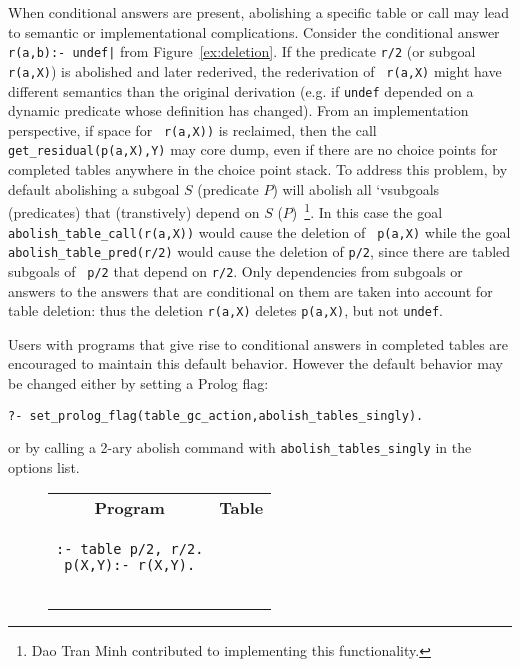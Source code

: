 \begin{description}
When conditional answers are present, abolishing a specific table or
call may lead to semantic or implementational complications.  Consider
the conditional answer {\tt r(a,b):- undef|} from
Figure~\ref{ex:deletion}.  If the predicate {\tt r/2} (or subgoal {\tt
  r(a,X)}) is abolished and later rederived, the rederivation of {\tt
  r(a,X)} might have different semantics than the original derivation
(e.g. if {\tt undef} depended on a dynamic predicate whose definition
has changed).  From an implementation perspective, if space for {\tt
  r(a,X))} is reclaimed, then the call {\tt get\_residual(p(a,X),Y)}
may core dump, even if there are no choice points for completed tables
anywhere in the choice point stack.  To address this problem, by
default abolishing a subgoal $S$ (predicate $P$) will abolish all
`vsubgoals (predicates) that (transtively) depend on $S$
($P$)~\footnote{Dao Tran Minh contributed to implementing this
  functionality.}.  In this case the goal {\tt
  abolish\_table\_call(r(a,X))} would cause the deletion of {\tt
  p(a,X)} while the goal {\tt abolish\_table\_pred(r/2)} would cause
the deletion of {\tt p/2}, since there are tabled subgoals of {\tt
  p/2} that depend on {\tt r/2}.  Only dependencies from subgoals or
answers to the answers that are conditional on them are taken into
account for table deletion: thus the deletion {\tt r(a,X)} deletes
{\tt p(a,X)}, but not {\tt undef}.

Users with programs that give rise to conditional answers in completed
tables are encouraged to maintain this default behavior.  However the
default behavior may be changed either by setting a Prolog flag:
%
\begin{verbatim}
?- set_prolog_flag(table_gc_action,abolish_tables_singly).
\end{verbatim}
%
or by calling a 2-ary abolish command with {\tt abolish\_tables\_singly}
in the options list.

\begin{figure}[htb]
\begin{center}
\begin{tabular}{cc}\hline \hline
\rule[-2ex]{0ex}{5ex} \textbf{Program} & \textbf{Table} \\
\begin{minipage}{14.5em}
\begin{verbatim}
:- table p/2, r/2.
p(X,Y):- r(X,Y).


\end{verbatim}
\end{minipage}
\end{tabular}
\end{center}
\end{figure}
\end{description}
